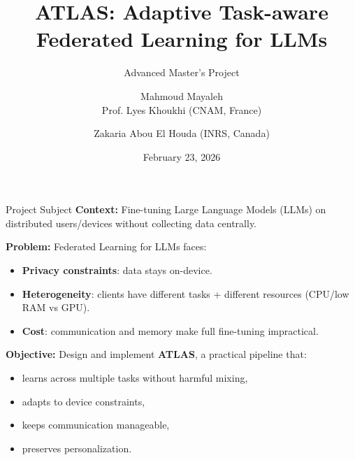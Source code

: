 \documentclass[aspectratio=169]{beamer}
\title{ATLAS: Adaptive Task-aware Federated Learning for LLMs}
\subtitle{Advanced Master's Project}
\author{Mahmoud Mayaleh \\[6pt] \small Prof. Lyes Khoukhi (CNAM, France) \and Zakaria Abou El Houda (INRS, Canada)}
\date{February 23, 2026}
\newcommand{\hl}[1]{\textcolor{cnamred}{\textbf{#1}}}
\begin{document}
\begin{frame}
  \titlepage
\end{frame}

\begin{frame}{Project Subject}
\textbf{Context:} Fine-tuning Large Language Models (LLMs) on distributed users/devices without collecting data centrally.

\vspace{0.3cm}
\textbf{Problem:} Federated Learning for LLMs faces:
\begin{itemize}
  \item \hl{Privacy constraints}: data stays on-device.
  \item \hl{Heterogeneity}: clients have different tasks + different resources (CPU/low RAM vs GPU).
  \item \hl{Cost}: communication and memory make full fine-tuning impractical.
\end{itemize}

\vspace{0.3cm}
\textbf{Objective:} Design and implement \hl{ATLAS}, a practical pipeline that:
\begin{itemize}
  \item learns across multiple tasks without harmful mixing,
  \item adapts to device constraints,
  \item keeps communication manageable,
  \item preserves personalization.
\end{itemize}
\end{frame}
\end{document}
